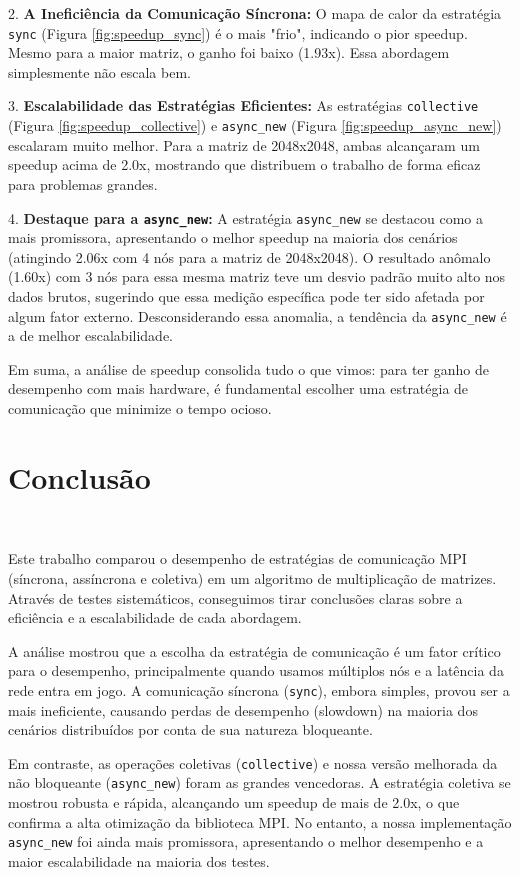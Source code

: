 \documentclass{article}
\begin{document}
2.  \textbf{A Ineficiência da Comunicação Síncrona:} O mapa de calor da estratégia \texttt{sync} (Figura \ref{fig:speedup_sync}) é o mais "frio", indicando o pior speedup. Mesmo para a maior matriz, o ganho foi baixo (1.93x). Essa abordagem simplesmente não escala bem.

3.  \textbf{Escalabilidade das Estratégias Eficientes:} As estratégias \texttt{collective} (Figura \ref{fig:speedup_collective}) e \texttt{async\_new} (Figura \ref{fig:speedup_async_new}) escalaram muito melhor. Para a matriz de 2048x2048, ambas alcançaram um speedup acima de 2.0x, mostrando que distribuem o trabalho de forma eficaz para problemas grandes.

4.  \textbf{Destaque para a \texttt{async\_new}:} A estratégia \texttt{async\_new} se destacou como a mais promissora, apresentando o melhor speedup na maioria dos cenários (atingindo 2.06x com 4 nós para a matriz de 2048x2048). O resultado anômalo (1.60x) com 3 nós para essa mesma matriz teve um desvio padrão muito alto nos dados brutos, sugerindo que essa medição específica pode ter sido afetada por algum fator externo. Desconsiderando essa anomalia, a tendência da \texttt{async\_new} é a de melhor escalabilidade.

Em suma, a análise de speedup consolida tudo o que vimos: para ter ganho de desempenho com mais hardware, é fundamental escolher uma estratégia de comunicação que minimize o tempo ocioso.

\section{Conclusão}
\

Este trabalho comparou o desempenho de estratégias de comunicação MPI (síncrona, assíncrona e coletiva) em um algoritmo de multiplicação de matrizes. Através de testes sistemáticos, conseguimos tirar conclusões claras sobre a eficiência e a escalabilidade de cada abordagem.

A análise mostrou que a escolha da estratégia de comunicação é um fator crítico para o desempenho, principalmente quando usamos múltiplos nós e a latência da rede entra em jogo. A comunicação síncrona (\texttt{sync}), embora simples, provou ser a mais ineficiente, causando perdas de desempenho (slowdown) na maioria dos cenários distribuídos por conta de sua natureza bloqueante.

Em contraste, as operações coletivas (\texttt{collective}) e nossa versão melhorada da não bloqueante (\texttt{async\_new}) foram as grandes vencedoras. A estratégia coletiva se mostrou robusta e rápida, alcançando um speedup de mais de 2.0x, o que confirma a alta otimização da biblioteca MPI. No entanto, a nossa implementação \texttt{async\_new} foi ainda mais promissora, apresentando o melhor desempenho e a maior escalabilidade na maioria dos testes.
\end{document}
